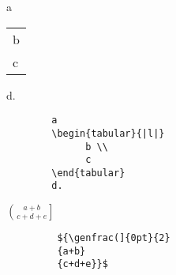 \documentclass[a4paper,10pt,landscape]{article}
\theoremstyle{definition}
\theoremstyle{remark}
\begin{document}
\begin{multicols}{3}
\begin{multicols}{2}
	a
	\begin{tabular}{|l|}
		b \\
		c
	\end{tabular}
	d.\\
\columnbreak
	\begin{verbatim}
		a
		\begin{tabular}{|l|}
			  b \\
			  c
		\end{tabular}
		d.
	\end{verbatim}
\end{multicols}
\begin{multicols}{2}
	 ${\genfrac(]{0pt}{2}{a+b}{c+d+e}}$
\columnbreak
	\begin{verbatim}
		 ${\genfrac(]{0pt}{2}
		 {a+b}
		 {c+d+e}}$
	\end{verbatim}
\end{multicols}


\end{multicols}
\end{document}
